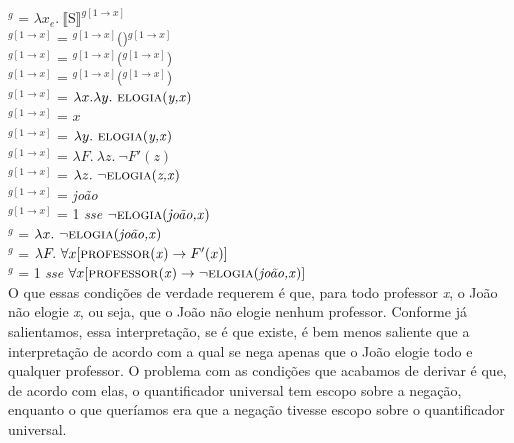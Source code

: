 \n {}$^{g}$ = $\lambda x_{e}.\
\llbracket\text{S}\rrbracket^{g[1\rightarrow x]}$\\

\n {}$^{g[1\rightarrow x]}$ = $^{g[1\rightarrow
x]}$()$^{g[1\rightarrow x]}$\\

\n {}$^{g[1\rightarrow x]}$ = $^{g[1\rightarrow
x]}$(\den{VP}$^{g[1\rightarrow x]}$)\\

\n {}$^{g[1\rightarrow x]}$ = $^{g[1\rightarrow
x]}$($^{g[1\rightarrow x]}$)\\

\n {}$^{g[1\rightarrow x]}$ = $\lambda x.\lambda y.\ \predica{elogia}{y,x}$\\

\n {}$^{g[1\rightarrow x]}$ = $x$\\

\n {}$^{g[1\rightarrow x]}$ = $\lambda y.\ \predica{elogia}{y,x}$\\

\n {}$^{g[1\rightarrow x]}$ = $\lambda F.\ \lambda z.\ \neg F'(z)$\\

\n {}$^{g[1\rightarrow x]}$ = $\lambda z.\ \neg\predica{elogia}{z,x}$\\

\n {}$^{g[1\rightarrow x]}$ = \textit{joão}\\

\n {}$^{g[1\rightarrow x]}$ = 1 \textit{sse}  $\neg\text{\textsc{elogia}(\textit{joão,x})}$\\

\n {}$^{g}$ = $\lambda x.\ \neg\predica{elogia}{joão,x}$\\

\n {}$^{g}$ = $\lambda F.\ \forall x [\text{\textsc{professor}(\textit{x})} \rightarrow F'(x)]$\\

\n {}$^{g}$ = 1 \textit{sse} $\forall x [\text{\textsc{professor}(\textit{x})} \rightarrow \neg\text{\textsc{elogia}(\textit{joão,x})}]$\\

\n O que essas condições de verdade requerem é que, para todo
professor \textit{x}, o João não elogie \textit{x}, ou seja, que o
João não elogie nenhum professor. Conforme já salientamos, essa interpretação, se é que
existe, é bem menos saliente que a interpretação de acordo com a qual se nega apenas que o João elogie todo e qualquer professor. O problema com as condições que
acabamos de derivar é que, de acordo com elas, o quantificador
universal tem escopo sobre a negação, enquanto o que queríamos
era que a negação tivesse escopo sobre o quantificador universal.

